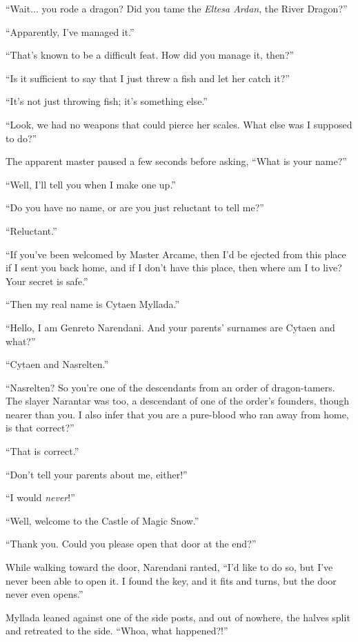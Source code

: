 ``Wait... you rode a dragon? Did you tame the \emph{Eltesa Ardan}, the River Dragon?''

``Apparently, I've managed it.''

``That's known to be a difficult feat. How did you manage it, then?''

``Is it sufficient to say that I just threw a fish and let her catch it?''

``It's not just throwing fish; it's something else.''

``Look, we had no weapons that could pierce her scales. What else was I supposed to do?''

The apparent master paused a few seconds before asking, ``What is your name?''

``Well, I'll tell you when I make one up.''

``Do you have no name, or are you just reluctant to tell me?''

``Reluctant.''

``If you've been welcomed by Master Arcame, then I'd be ejected from this place if I sent you back home, and if I don't have this place, then where am I to live? Your secret is safe.''

``Then my real name is Cytaen Myllada.''

``Hello, I am Genreto Narendani. And your parents' surnames are Cytaen and what?''

``Cytaen and Nasrelten.''

``Nasrelten? So you're one of the descendants from an order of dragon-tamers. The slayer Narantar was too, a descendant of one of the order's founders, though nearer than you. I also infer that you are a pure-blood who ran away from home, is that correct?''

``That is correct.''

``Don't tell your parents about me, either!''

``I would \emph{never}!''

``Well, welcome to the Castle of Magic Snow.''

``Thank you. Could you please open that door at the end?''

While walking toward the door, Narendani ranted, ``I'd like to do so, but I've never been able to open it. I found the key, and it fits and turns, but the door never even opens.''

Myllada leaned against one of the side posts, and out of nowhere, the halves split and retreated to the side. ``Whoa, what happened?!''

